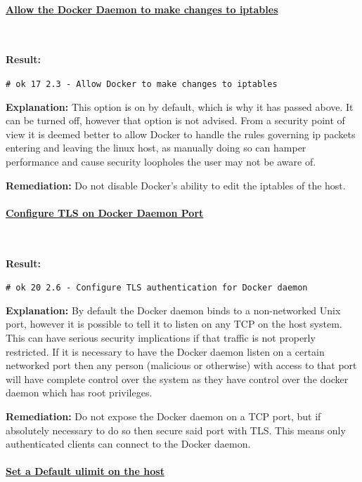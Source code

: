 \documentclass{article}
\begin{document}
\paragraph{\underline{Allow the Docker Daemon to make changes to iptables}}\mbox{}\\
\label{par:iptables}

\textbf{Result:} 

\texttt{\# ok 17 2.3  - Allow Docker to make changes to iptables}

\textbf{Explanation:} This option is on by default, which is why it has passed above. It can be turned off, however that option is not advised. From a security point of view it is deemed better to allow Docker to handle the rules governing ip packets entering and leaving the linux host, as manually doing so can hamper performance and cause security loopholes the user may not be aware of.

\textbf{Remediation:} Do not disable Docker's ability to edit the iptables of the host.

\paragraph{\underline{Configure TLS on Docker Daemon Port}}\mbox{}\\
\label{par:tls}

\textbf{Result:} 

\texttt{\# ok 20 2.6  - Configure TLS authentication for Docker daemon}

\textbf{Explanation:} By default the Docker daemon binds to a non-networked Unix port, however it is possible to tell it to listen on any TCP on the host system. This can have serious security implications if that traffic is not properly restricted. If it is necessary to have the Docker daemon listen on a certain networked port then any person (malicious or otherwise) with access to that port will have complete control over the system as they have control over the docker daemon which has root privileges.

\textbf{Remediation:} Do not expose the Docker daemon on a TCP port, but if absolutely necessary to do so then secure said port with TLS. This means only authenticated clients can connect to the Docker daemon.

\paragraph{\underline{Set a Default ulimit on the host}}\mbox{}\\
\label{par:ulimit}
\end{document}
